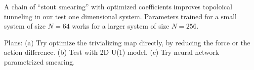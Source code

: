 A chain of ``stout smearing'' with optimized coefficients improves topoloical tunneling
in our test one dimensional system.
Parameters trained for a small system of size $N=64$
works for a larger system of size $N=256$.

Plans: (a) Try optimize the trivializing map directly, by reducing the force or the action difference.
(b) Test with 2D U(1) model.
(c) Try neural network parametrized smearing.
